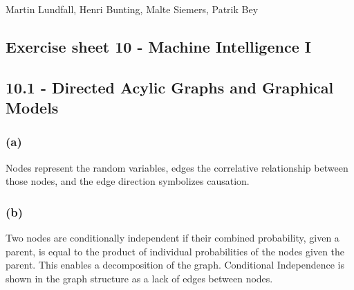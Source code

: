 \documentclass[11pt,a4paper]{article}
\begin{document}
\noindent
Martin Lundfall, Henri Bunting, Malte Siemers, Patrik Bey
\begin{centering}
  \section*{Exercise sheet 10 - Machine Intelligence I}
  \end{centering}
  
    \subsection*{10.1 - Directed Acylic Graphs and Graphical Models}
  
  \subsubsection*{(a)} Nodes represent the random variables, edges the correlative relationship between those nodes, and the edge direction symbolizes causation.
  \subsubsection*{(b)} Two nodes are conditionally independent if their combined probability, given a parent, is equal to the product of individual probabilities of the nodes given the parent.  This enables a decomposition of the graph.  Conditional Independence is shown in the graph structure as a lack of edges between nodes. 
  \newpage
\end{document}
